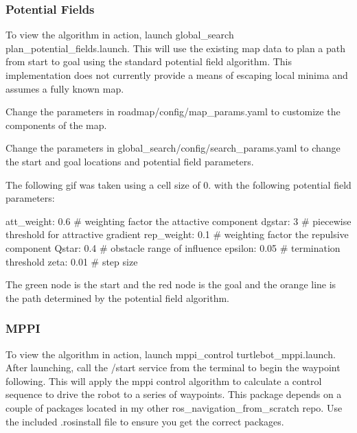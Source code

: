 \subsubsection*{Potential Fields}

To view the algorithm in action, launch {\ttfamily global\+\_\+search plan\+\_\+potential\+\_\+fields.\+launch}. This will use the existing map data to plan a path from start to goal using the standard potential field algorithm. This implementation does not currently provide a means of escaping local minima and assumes a fully known map.


\begin{DoxyItemize}
\item Change the parameters in {\ttfamily roadmap/config/map\+\_\+params.\+yaml} to customize the components of the map.
\item Change the parameters in {\ttfamily global\+\_\+search/config/search\+\_\+params.\+yaml} to change the start and goal locations and potential field parameters.
\end{DoxyItemize}

The following gif was taken using a cell size of 0. with the following potential field parameters\+: 
\begin{DoxyCode}
att\_weight: 0.6 # weighting factor the attactive component
dgstar: 3 # piecewise threshold for attractive gradient
rep\_weight: 0.1 # weighting factor the repulsive component
Qstar: 0.4 # obstacle range of influence
epsilon: 0.05 # termination threshold
zeta: 0.01 # step size
\end{DoxyCode}
 The green node is the start and the red node is the goal and the orange line is the path determined by the potential field algorithm.



\subsubsection*{M\+P\+PI}

To view the algorithm in action, launch {\ttfamily mppi\+\_\+control turtlebot\+\_\+mppi.\+launch}. After launching, call the {\ttfamily /start} service from the terminal to begin the waypoint following. This will apply the mppi control algorithm to calculate a control sequence to drive the robot to a series of waypoints. This package depends on a couple of packages located in my other {\ttfamily ros\+\_\+navigation\+\_\+from\+\_\+scratch} repo. Use the included .rosinstall file to ensure you get the correct packages.


